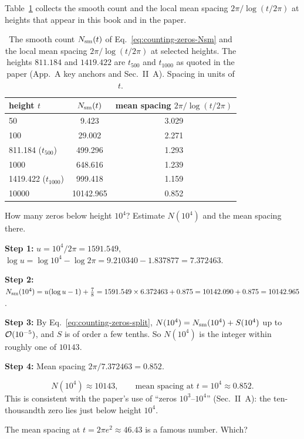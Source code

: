 Table~\ref{tab:counting-zeros-gaps} collects the smooth count and the local mean spacing $2\pi/\log(t/2\pi)$ at heights that appear in this book and in the paper.

\begin{table}[htbp]\centering
\caption{The smooth count $N_{\mathrm{sm}}(t)$ of Eq.~\eqref{eq:counting-zeros-Nsm} and the local mean spacing $2\pi/\log(t/2\pi)$ at selected heights. The heights $811.184$ and $1419.422$ are $t_{500}$ and $t_{1000}$ as quoted in the paper (App.~A key anchors and Sec.~II~A). Spacing in units of $t$.}
\label{tab:counting-zeros-gaps}
\begin{tabular}{lcc}
\toprule
height $t$ & $N_{\mathrm{sm}}(t)$ & mean spacing $2\pi/\log(t/2\pi)$\\
\midrule
50 & 9.423 & 3.029\\
100 & 29.002 & 2.271\\
811.184 ($t_{500}$) & 499.296 & 1.293\\
1000 & 648.616 & 1.239\\
1419.422 ($t_{1000}$) & 999.418 & 1.159\\
10000 & 10142.965 & 0.852\\
\bottomrule
\end{tabular}
\end{table}

\begin{sample}{How many zeros below height $10^4$?}
Estimate $N(10^4)$ and the mean spacing there.

\textbf{Step 1:} $u=10^4/2\pi=1591.549$, $\log u=\log10^4-\log2\pi=9.210340-1.837877=7.372463$.

\textbf{Step 2:} $N_{\mathrm{sm}}(10^4)=u(\log u-1)+\tfrac78=1591.549\times6.372463+0.875=10142.090+0.875=10142.965$.

\textbf{Step 3:} By Eq.~\eqref{eq:counting-zeros-split}, $N(10^4)=N_{\mathrm{sm}}(10^4)+S(10^4)$ up to $\mathcal{O}(10^{-5})$, and $S$ is of order a few tenths. So $N(10^4)$ is the integer within roughly one of $10143$.

\textbf{Step 4:} Mean spacing $2\pi/7.372463=0.852$.

\[
\boxed{N(10^4)\approx10143,\qquad\text{mean spacing at }t=10^4\approx0.852.}
\]
This is consistent with the paper's use of ``zeros $10^3$--$10^4$'' (Sec.~II~A): the ten-thousandth zero lies just below height $10^4$.
\end{sample}

\begin{checkpoint}
The mean spacing at $t=2\pi e^2\approx46.43$ is a famous number. Which?
\end{checkpoint}

